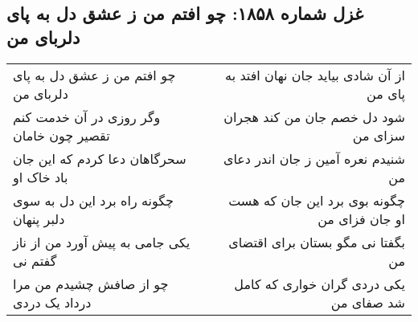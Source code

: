 \begin{center}
\section*{غزل شماره ۱۸۵۸: چو افتم من ز عشق دل به پای دلربای من}
\label{sec:1858}
\begin{longtable}{l p{0.5cm} r}
چو افتم من ز عشق دل به پای دلربای من
&&
از آن شادی بیاید جان نهان افتد به پای من
\\
وگر روزی در آن خدمت کنم تقصیر چون خامان
&&
شود دل خصم جان من کند هجران سزای من
\\
سحرگاهان دعا کردم که این جان باد خاک او
&&
شنیدم نعره آمین ز جان اندر دعای من
\\
چگونه راه برد این دل به سوی دلبر پنهان
&&
چگونه بوی برد این جان که هست او جان فزای من
\\
یکی جامی به پیش آورد من از ناز گفتم نی
&&
بگفتا نی مگو بستان برای اقتضای من
\\
چو از صافش چشیدم من مرا درداد یک دردی
&&
یکی دردی گران خواری که کامل شد صفای من
\\
\end{longtable}
\end{center}
